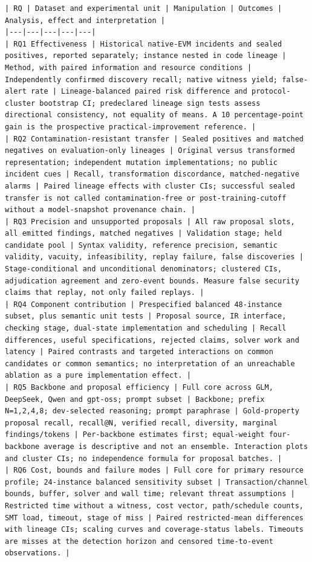 \documentclass[11pt,a4paper]{article}
\begin{document}
\begin{verbatim}
| RQ | Dataset and experimental unit | Manipulation | Outcomes | Analysis, effect and interpretation |
|---|---|---|---|---|
| RQ1 Effectiveness | Historical native-EVM incidents and sealed positives, reported separately; instance nested in code lineage | Method, with paired information and resource conditions | Independently confirmed discovery recall; native witness yield; false-alert rate | Lineage-balanced paired risk difference and protocol-cluster bootstrap CI; predeclared lineage sign tests assess directional consistency, not equality of means. A 10 percentage-point gain is the prospective practical-improvement reference. |
| RQ2 Contamination-resistant transfer | Sealed positives and matched negatives on evaluation-only lineages | Original versus transformed representation; independent mutation implementations; no public incident cues | Recall, transformation discordance, matched-negative alarms | Paired lineage effects with cluster CIs; successful sealed transfer is not called contamination-free or post-training-cutoff without a model-snapshot provenance chain. |
| RQ3 Precision and unsupported proposals | All raw proposal slots, all emitted findings, matched negatives | Validation stage; held candidate pool | Syntax validity, reference precision, semantic validity, vacuity, infeasibility, replay failure, false discoveries | Stage-conditional and unconditional denominators; clustered CIs, adjudication agreement and zero-event bounds. Measure false security claims that replay, not only failed replays. |
| RQ4 Component contribution | Prespecified balanced 48-instance subset, plus semantic unit tests | Proposal source, IR interface, checking stage, dual-state implementation and scheduling | Recall differences, useful specifications, rejected claims, solver work and latency | Paired contrasts and targeted interactions on common candidates or common semantics; no interpretation of an unreachable ablation as a pure implementation effect. |
| RQ5 Backbone and proposal efficiency | Full core across GLM, DeepSeek, Qwen and gpt-oss; prompt subset | Backbone; prefix N=1,2,4,8; dev-selected reasoning; prompt paraphrase | Gold-property proposal recall, recall@N, verified recall, diversity, marginal findings/tokens | Per-backbone estimates first; equal-weight four-backbone average is descriptive and not an ensemble. Interaction plots and cluster CIs; no independence formula for proposal batches. |
| RQ6 Cost, bounds and failure modes | Full core for primary resource profile; 24-instance balanced sensitivity subset | Transaction/channel bounds, buffer, solver and wall time; relevant threat assumptions | Restricted time without a witness, cost vector, path/schedule counts, SMT load, timeout, stage of miss | Paired restricted-mean differences with lineage CIs; scaling curves and coverage-status labels. Timeouts are misses at the detection horizon and censored time-to-event observations. |


\end{verbatim}
\end{document}
